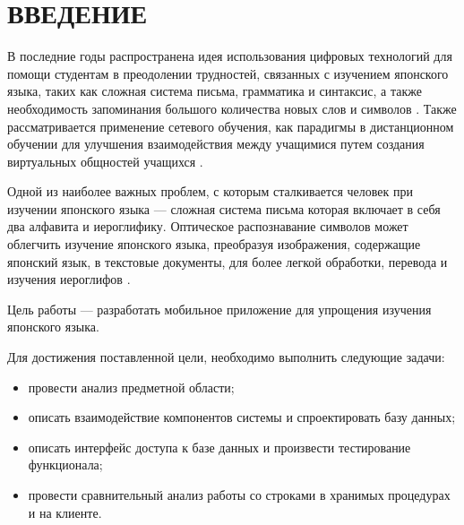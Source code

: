 \chapter*{ВВЕДЕНИЕ}

В последние годы распространена идея использования цифровых
технологий для помощи студентам в преодолении трудностей,
связанных с изучением японского языка, таких как сложная система
письма, грамматика и синтаксис, а также необходимость запоминания
большого количества новых слов и символов \cite{muhtarova}.
Также рассматривается применение сетевого обучения, как парадигмы в
дистанционном обучении для улучшения взаимодействия между
учащимися путем создания виртуальных общностей учащихся \cite{edu-network}.

Одной из наиболее важных проблем, с которым сталкивается человек
при изучении японского языка --- сложная система письма которая
включает в себя два алфавита и иероглифику. Оптическое распознавание
символов может облегчить изучение японского языка, преобразуя
изображения, содержащие японский язык, в текстовые документы,
для более легкой обработки, перевода и изучения иероглифов \cite{ocr-usage}.

Цель работы --- разработать мобильное приложение для упрощения
изучения японского языка.

Для достижения поставленной цели, необходимо выполнить следующие
задачи:

\begin{itemize}[label={$-$}]
  \item провести анализ предметной области;
  \item описать взаимодействие компонентов системы и спроектировать базу данных;
  \item описать интерфейс доступа к базе данных и произвести тестирование функционала;
  \item провести сравнительный анализ работы со строками в хранимых процедурах и на клиенте.
\end{itemize}

